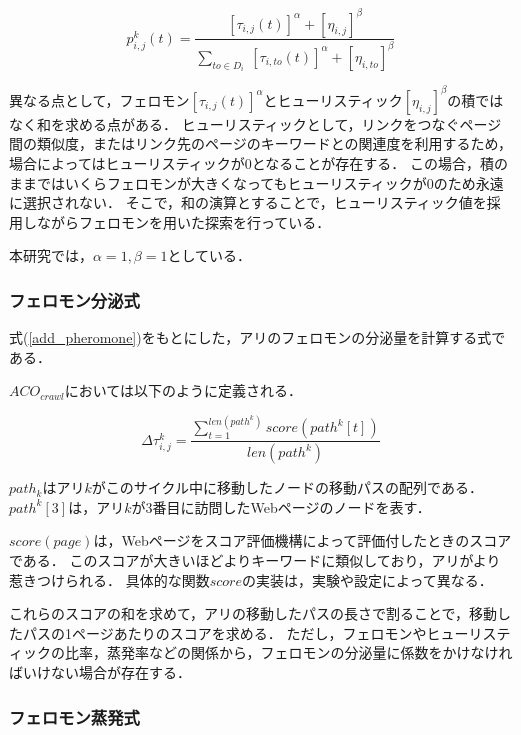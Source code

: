 \begin{equation}
    \label{crawl_move}
    p_{i, j}^k(t) = {\frac{[{\tau}_{i, j}(t)]^{\alpha} + [{\eta}_{i, j}]^{\beta}}{{\sum}_{to{\in}D_i} \ [{\tau}_{i, to}(t)]^{\alpha}+[{\eta}_{i, to}]^{\beta}}}
\end{equation}

異なる点として，フェロモン\([{\tau}_{i, j}(t)]^{\alpha}\)とヒューリスティック\([{\eta}_{i, j}]^{\beta}\)の積ではなく和を求める点がある．
ヒューリスティックとして，リンクをつなぐページ間の類似度，またはリンク先のページのキーワードとの関連度を利用するため，場合によってはヒューリスティックが0となることが存在する．
この場合，積のままではいくらフェロモンが大きくなってもヒューリスティックが0のため永遠に選択されない．
そこで，和の演算とすることで，ヒューリスティック値を採用しながらフェロモンを用いた探索を行っている．

本研究では，\(\alpha=1, \beta=1\)としている．

\subsubsection{フェロモン分泌式}

式(\ref{add_pheromone})をもとにした，アリのフェロモンの分泌量を計算する式である．

\(ACO_{crawl}\)においては以下のように定義される．

\begin{equation}
    \label{crawl_add_pheromone}
    {\Delta}{\tau}_{i, j}^k = {\frac{\sum_{t=1}^{len(path^k)} score(path^k[t])}{len(path^k)}}
\end{equation}

\(path_k\)はアリ\(k\)がこのサイクル中に移動したノードの移動パスの配列である．\(path^k[3]\)は，アリ\(k\)が3番目に訪問したWebページのノードを表す．

\(score(page)\)は，Webページをスコア評価機構によって評価付したときのスコアである．
このスコアが大きいほどよりキーワードに類似しており，アリがより惹きつけられる．
具体的な関数\(score\)の実装は，実験や設定によって異なる．

これらのスコアの和を求めて，アリの移動したパスの長さで割ることで，移動したパスの1ページあたりのスコアを求める．
ただし，フェロモンやヒューリスティックの比率，蒸発率などの関係から，フェロモンの分泌量に係数をかけなければいけない場合が存在する．

\subsubsection{フェロモン蒸発式}

